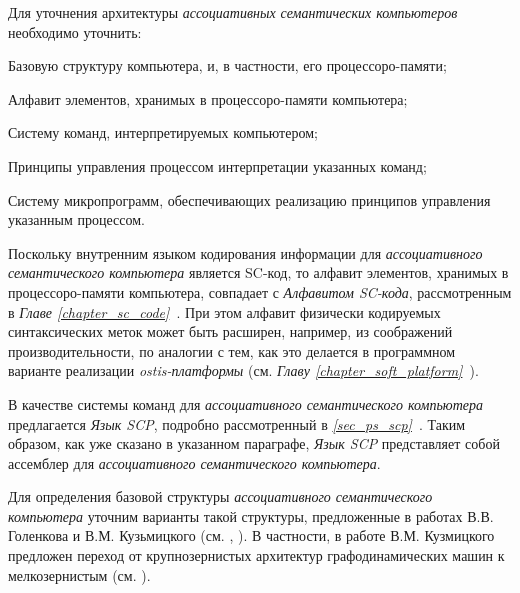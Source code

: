 \begin{SCn}
\end{SCn}

Для уточнения архитектуры \textit{ассоциативных семантических компьютеров} необходимо уточнить:
\begin{textitemize}
	\item Базовую структуру компьютера, и, в частности, его процессоро-памяти;
	\item Алфавит элементов, хранимых в процессоро-памяти компьютера;
	\item Систему команд, интерпретируемых компьютером;
	\item Принципы управления процессом интерпретации указанных команд;
	\item Систему микропрограмм, обеспечивающих реализацию принципов управления указанным процессом.
\end{textitemize}

Поскольку внутренним языком кодирования информации для \textit{ассоциативного семантического компьютера} является SC-код, то алфавит элементов, хранимых в процессоро-памяти компьютера, совпадает с \textit{Алфавитом SC-кода}, рассмотренным в \textit{Главе \ref{chapter_sc_code}~}. При этом алфавит физически кодируемых  синтаксических меток может быть расширен, например, из соображений производительности, по аналогии с тем, как это делается в программном варианте реализации \textit{ostis-платформы} (см. \textit{Главу \ref{chapter_soft_platform}~}).

В качестве системы команд для \textit{ассоциативного семантического компьютера} предлагается \textit{Язык SCP}, подробно рассмотренный в \textit{\ref{sec_ps_scp}~}. Таким образом, как уже сказано в указанном параграфе, \textit{Язык SCP} представляет собой ассемблер для \textit{ассоциативного семантического компьютера}.

Для определения базовой структуры \textit{ассоциативного семантического компьютера} уточним варианты такой структуры, предложенные в работах В.В. Голенкова и В.М. Кузьмицкого (см. , ). В частности, в работе В.М. Кузмицкого предложен переход от крупнозернистых архитектур графодинамических машин к мелкозернистым (см. ).

